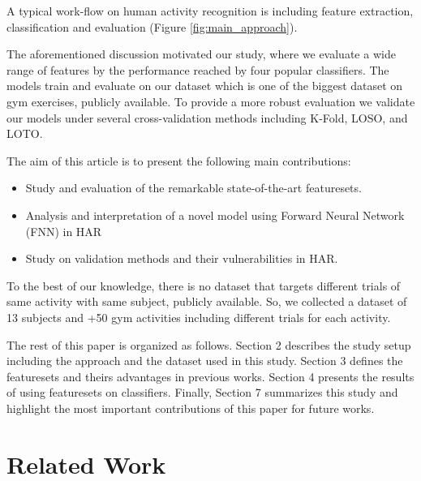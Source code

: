 \documentclass[journal,article,submit,moreauthors,pdftex]{Definitions/mdpi}
\begin{document}
A typical work-flow on human activity recognition is including feature extraction, classification and evaluation (Figure \ref{fig:main_approach}).


The aforementioned discussion motivated our study, where we evaluate a wide range of features by the performance reached by four popular classifiers. The models train and evaluate on our dataset which is one of the biggest dataset on gym exercises, publicly available. To provide a more robust evaluation we validate our models under several cross-validation methods including K-Fold, LOSO, and LOTO.

The aim of this article is to present the following main contributions:
\begin{itemize}
	\item Study and evaluation of the remarkable state-of-the-art featuresets.
	\item Analysis and interpretation of a novel model using Forward Neural Network (FNN) in HAR
	\item Study on validation methods and their vulnerabilities in HAR.
\end{itemize}
To the best of our knowledge, there is no dataset that targets different trials of same activity with same subject, publicly available. So, we collected a dataset of 13 subjects and +50 gym activities including different trials for each activity.

The rest of this paper is organized as follows. Section 2 describes the study setup including the approach and the dataset used in this study. Section 3 defines the featuresets and theirs advantages in previous works. Section 4 presents the results of using featuresets on classifiers. Finally, Section 7 summarizes this study and highlight the most important contributions of this paper for future works.
\section{Related Work}
\end{document}
